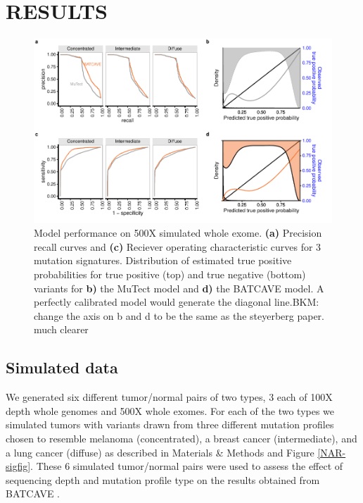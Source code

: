 \documentclass[a4,center,fleqn]{NAR}
\newcommand{\bkmcomment}[1]{{\color{blue}BKM: #1}}
\newcommand{\batcave}{BATCAVE }
\begin{document}
\section{RESULTS}
\begin{figure}
  \begin{center}
  \includegraphics{figures/fig_wes.pdf}
  \end{center}
  \caption{Model performance on 500X simulated whole exome.
  \textbf{(a)} Precision recall curves and \textbf{(c)} Reciever operating characteristic curves for 3 mutation signatures.
  Distribution of estimated true positive probabilities for true positive (top) and true negative (bottom) variants for \textbf{b)} the MuTect model and \textbf{d)} the \batcave model.
  A perfectly calibrated model would generate the diagonal line.\bkmcomment{change the axis on b and d to be the same as the steyerberg paper. much clearer}}
\label{NAR-wes_fig}
\end{figure}

\subsection{Simulated data}
We generated six different tumor/normal pairs of two types, 3 each of 100X depth whole genomes and 500X whole exomes.
For each of the two types we simulated tumors with variants drawn from three different mutation profiles chosen to resemble melanoma (concentrated), a breast cancer (intermediate), and a lung cancer (diffuse)  as described in Materials \& Methods and Figure \ref{NAR-sigfig}.
These 6 simulated tumor/normal pairs were used to assess the effect of sequencing depth and mutation profile type on the results obtained from \batcave.
\end{document}
